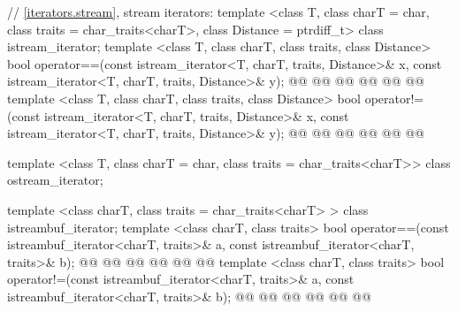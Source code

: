 \begin{codeblock}
  // \ref{iterators.stream}, stream iterators:
  template <class T, class charT = char, class traits = char_traits<charT>,
      class Distance = ptrdiff_t>
  class istream_iterator;
  template <class T, class charT, class traits, class Distance>
    bool operator==(const istream_iterator<T, charT, traits, Distance>& x,
            const istream_iterator<T, charT, traits, Distance>& y);
  @@
    @@
            @@
  @@
    @@
            @@
  template <class T, class charT, class traits, class Distance>
    bool operator!=(const istream_iterator<T, charT, traits, Distance>& x,
            const istream_iterator<T, charT, traits, Distance>& y);
  @@
    @@
            @@
  @@
    @@
            @@

  template <class T, class charT = char, class traits = char_traits<charT>>
      class ostream_iterator;

  template <class charT, class traits = char_traits<charT> >
    class istreambuf_iterator;
  template <class charT, class traits>
    bool operator==(const istreambuf_iterator<charT, traits>& a,
            const istreambuf_iterator<charT, traits>& b);
  @@
    @@
            @@
  @@
    @@
            @@
  template <class charT, class traits>
    bool operator!=(const istreambuf_iterator<charT, traits>& a,
            const istreambuf_iterator<charT, traits>& b);
  @@
    @@
            @@
  @@
    @@
            @@


\end{codeblock}
